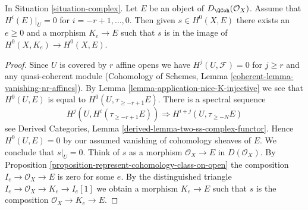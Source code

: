 \begin{lemma}
\label{lemma-represent-cohomology-class-on-closed}
In Situation \ref{situation-complex}. Let $E$ be an object of
$D_\QCoh(\mathcal{O}_X)$.
Assume that $H^i(E)|_U = 0$ for $i = - r + 1, \ldots, 0$.
Then given $s \in H^0(X, E)$ there exists an $e \geq 0$ and
a morphism $K_e \to E$ such that $s$ is in the image of
$H^0(X, K_e) \to H^0(X, E)$.
\end{lemma}

\begin{proof}
Since $U$ is covered by $r$ affine opens we have $H^j(U, \mathcal{F}) = 0$
for $j \geq r$ and any quasi-coherent module
(Cohomology of Schemes, Lemma \ref{coherent-lemma-vanishing-nr-affines}).
By Lemma \ref{lemma-application-nice-K-injective} we see that $H^0(U, E)$
is equal to $H^0(U, \tau_{\geq -r + 1}E)$. There is
a spectral sequence
$$
H^j(U, H^i(\tau_{\geq -r + 1}E)) \Rightarrow H^{i + j}(U, \tau_{\geq -N}E)
$$
see Derived Categories, Lemma \ref{derived-lemma-two-ss-complex-functor}.
Hence $H^0(U, E) = 0$ by our assumed vanishing of cohomology sheaves of $E$.
We conclude that $s|_U = 0$.
Think of $s$ as a morphism $\mathcal{O}_X \to E$ in $D(\mathcal{O}_X)$.
By Proposition \ref{proposition-represent-cohomology-class-on-open}
the composition $I_e \to \mathcal{O}_X \to E$ is zero for some $e$.
By the distinguished triangle $I_e \to \mathcal{O}_X \to K_e \to I_e[1]$
we obtain a morphism $K_e \to E$ such that $s$ is the composition
$\mathcal{O}_X \to K_e \to E$.
\end{proof}
